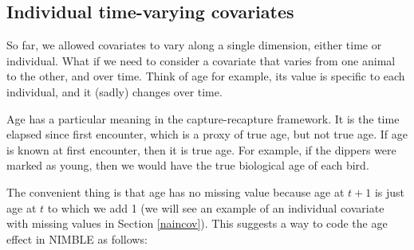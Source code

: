 \documentclass[
  12pt,
]{krantz}
\begin{document}
\subsection{Individual time-varying covariates}\label{individual-time-varying-covariates}

So far, we allowed covariates to vary along a single dimension, either time or individual. What if we need to consider a covariate that varies from one animal to the other, and over time. Think of age for example, its value is specific to each individual, and it (sadly) changes over time.

Age has a particular meaning in the capture-recapture framework. It is the time elapsed since first encounter, which is a proxy of true age, but not true age. If age is known at first encounter, then it is true age. For example, if the dippers were marked as young, then we would have the true biological age of each bird.

The convenient thing is that age has no missing value because age at \(t+1\) is just age at \(t\) to which we add 1 (we will see an example of an individual covariate with missing values in Section \ref{naincov}). This suggests a way to code the age effect in NIMBLE as follows:
\end{document}
